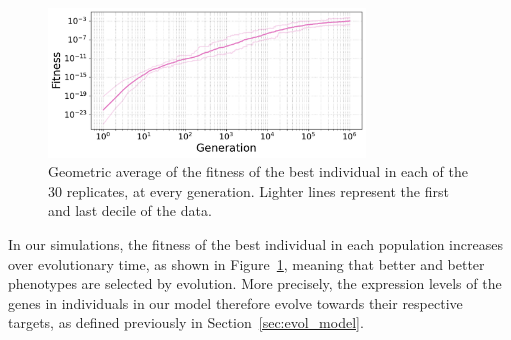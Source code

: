 \begin{figure}[H]
  \centering
  \includegraphics[width=0.75\textwidth]{ploscb/img/all_fitness.pdf}
  \caption{Geometric average of the fitness of the best individual in each of the 30 replicates, at every generation.
  Lighter lines represent the first and last decile of the data.}
  \label{fig:main_fitness}
\end{figure}

In our simulations, the fitness of the best individual in each population increases over evolutionary time, as shown in Figure~\ref{fig:main_fitness}, meaning that better and better phenotypes are selected by evolution. More precisely, the expression levels of the genes in individuals in our model therefore evolve towards their respective targets, as defined previously in Section~\ref{sec:evol_model}.


